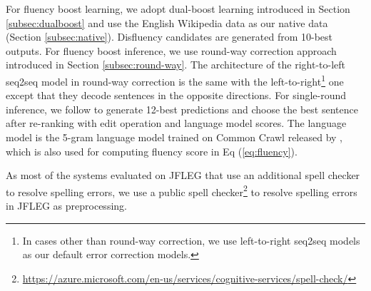 \documentclass{article} \usepackage{MSRA_TR,times}
\begin{document}
For fluency boost learning, we adopt dual-boost learning introduced in Section \ref{subsec:dualboost} and use the English Wikipedia data as our native data (Section \ref{subsec:native}). Disfluency candidates are generated from 10-best outputs. For fluency boost inference, we use round-way correction approach introduced in Section \ref{subsec:round-way}. The architecture of the right-to-left seq2seq model in round-way correction is the same with the left-to-right\footnote{In cases other than round-way correction, we use left-to-right seq2seq models as our default error correction models.} one except that they decode sentences in the opposite directions. For single-round inference, we follow \cite{chollampatt2018} to generate 12-best predictions and choose the best sentence after re-ranking with edit operation and language model scores. The language model is the 5-gram language model trained on Common Crawl released by \cite{junczys2016phrase}, which is also used for computing fluency score in Eq (\ref{eq:fluency}).

As most of the systems \citep{sakaguchi2017grammatical,chollampatt2018,grundkiewicz2018near} evaluated on JFLEG that use an additional spell checker to resolve spelling errors, we use a public spell checker\footnote{\url{https://azure.microsoft.com/en-us/services/cognitive-services/spell-check/}} to resolve spelling errors in JFLEG as preprocessing.
\end{document}
